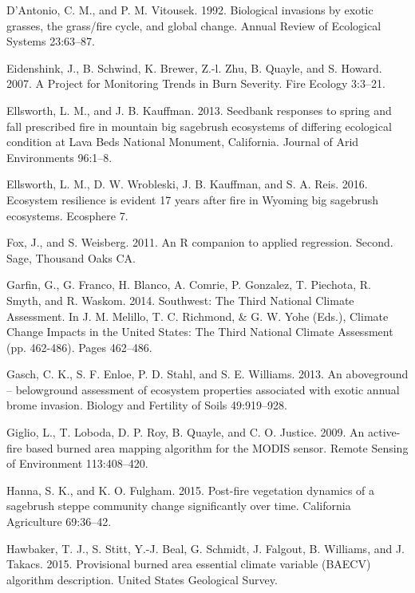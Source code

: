 \documentclass[12pt,]{article}
\begin{document}
\hypertarget{ref-DAntonio1992}{}
D'Antonio, C. M., and P. M. Vitousek. 1992. Biological invasions by
exotic grasses, the grass/fire cycle, and global change. Annual Review
of Ecological Systems 23:63--87.

\hypertarget{ref-Eidenshink2007}{}
Eidenshink, J., B. Schwind, K. Brewer, Z.-l. Zhu, B. Quayle, and S.
Howard. 2007. A Project for Monitoring Trends in Burn Severity. Fire
Ecology 3:3--21.

\hypertarget{ref-Ellsworth2013}{}
Ellsworth, L. M., and J. B. Kauffman. 2013. Seedbank responses to spring
and fall prescribed fire in mountain big sagebrush ecosystems of
differing ecological condition at Lava Beds National Monument,
California. Journal of Arid Environments 96:1--8.

\hypertarget{ref-Ellsworth2016}{}
Ellsworth, L. M., D. W. Wrobleski, J. B. Kauffman, and S. A. Reis. 2016.
Ecosystem resilience is evident 17 years after fire in Wyoming big
sagebrush ecosystems. Ecosphere 7.

\hypertarget{ref-Fox2011}{}
Fox, J., and S. Weisberg. 2011. An R companion to applied regression.
Second. Sage, Thousand Oaks CA.

\hypertarget{ref-Garfin2014}{}
Garfin, G., G. Franco, H. Blanco, A. Comrie, P. Gonzalez, T. Piechota,
R. Smyth, and R. Waskom. 2014. Southwest: The Third National Climate
Assessment. In J. M. Melillo, T. C. Richmond, \& G. W. Yohe (Eds.),
Climate Change Impacts in the United States: The Third National Climate
Assessment (pp. 462-486). Pages 462--486.

\hypertarget{ref-Gasch2013}{}
Gasch, C. K., S. F. Enloe, P. D. Stahl, and S. E. Williams. 2013. An
aboveground -- belowground assessment of ecosystem properties associated
with exotic annual brome invasion. Biology and Fertility of Soils
49:919--928.

\hypertarget{ref-Giglio2009}{}
Giglio, L., T. Loboda, D. P. Roy, B. Quayle, and C. O. Justice. 2009. An
active-fire based burned area mapping algorithm for the MODIS sensor.
Remote Sensing of Environment 113:408--420.

\hypertarget{ref-Hanna2015}{}
Hanna, S. K., and K. O. Fulgham. 2015. Post-fire vegetation dynamics of
a sagebrush steppe community change significantly over time. California
Agriculture 69:36--42.

\hypertarget{ref-Hawbaker2015a}{}
Hawbaker, T. J., S. Stitt, Y.-J. Beal, G. Schmidt, J. Falgout, B.
Williams, and J. Takacs. 2015. Provisional burned area essential climate
variable (BAECV) algorithm description. United States Geological Survey.
\end{document}
